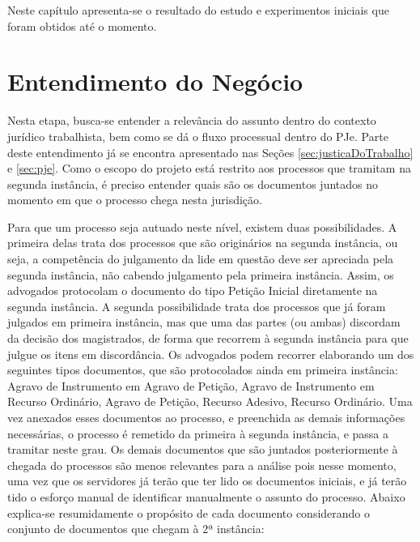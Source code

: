 \label{cap:Resultados}%
Neste capítulo apresenta-se o resultado do estudo e experimentos iniciais que foram obtidos até o momento.

\section{\label{sec:entendimentoNegocio}Entendimento do Negócio}

Nesta etapa, busca-se entender a relevância do assunto dentro do contexto jurídico trabalhista, bem como se dá o fluxo processual dentro do PJe. Parte deste entendimento já se encontra apresentado nas Seções \ref{sec:justicaDoTrabalho} e \ref{sec:pje}. Como o escopo do projeto está restrito aos processos que tramitam na segunda instância, é preciso entender quais são os documentos juntados no momento em que o processo chega nesta jurisdição. 

Para que um processo seja autuado neste nível, existem duas possibilidades. A primeira delas trata dos processos que são originários na segunda instância, ou seja, a competência do julgamento da lide em questão deve ser apreciada pela segunda instância, não cabendo julgamento pela primeira instância. Assim, os advogados protocolam o documento do tipo Petição Inicial diretamente na segunda instância. A segunda possibilidade trata dos processos que já foram julgados em primeira instância, mas que uma das partes (ou ambas) discordam da decisão dos magistrados, de forma que recorrem à segunda instância para que julgue os itens em discordância. Os advogados podem recorrer elaborando um dos seguintes tipos documentos, que são protocolados ainda em primeira instância: Agravo de Instrumento em Agravo de Petição, Agravo de Instrumento em Recurso Ordinário, Agravo de Petição, Recurso Adesivo, Recurso Ordinário. Uma vez anexados esses documentos ao processo, e preenchida as demais informações necessárias, o processo é remetido da primeira à segunda instância, e passa a tramitar neste grau. Os demais documentos que são juntados posteriormente à chegada do processos são menos relevantes para a análise pois nesse momento, uma vez que os servidores já terão que ter lido os documentos iniciais, e já terão tido o esforço manual de identificar manualmente o assunto do processo.  Abaixo explica-se resumidamente o propósito de cada documento considerando o conjunto de documentos que chegam à 2ª instância:



